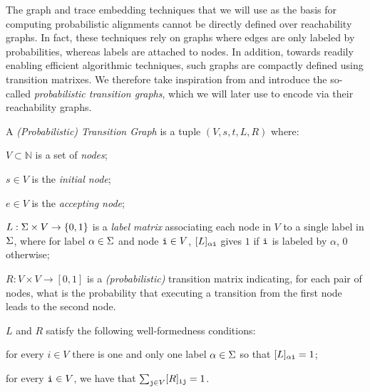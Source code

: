 The graph and trace embedding techniques that we will use as the basis for computing probabilistic alignments cannot be directly defined over reachability graphs. In fact, these techniques rely on graphs where edges are only labeled by probabilities, whereas labels are attached to nodes. In addition, towards readily enabling efficient algorithmic techniques, such graphs are compactly defined using transition matrixes. We therefore take inspiration from \cite{GartnerFW03} and introduce the so-called \emph{probabilistic transition graphs}, which we will later use to encode  via their reachability graphs.

\begin{definition} A \emph{(Probabilistic) Transition Graph} is a tuple $(V,s,t,L,R)$ where:
  \begin{inparaenum}[\itshape (i)]
    \item $V \subset \mathbb{N}$ is a set of \emph{nodes};
    \item $s\in V$ is the \emph{initial node};
    \item $e\in V$ is the \emph{accepting node};
    \item $L: \Sigma \times V \rightarrow \{0,1\}$ is a \emph{label matrix} associating each node in $V$ to a single label in $\Sigma$, where for label $\alpha \in \Sigma$ and node $\textnormal{\texttt{i}} \in V$, $[L]_{\alpha\textnormal{\texttt{i}}}$ gives $1$ if $\textnormal{\texttt{i}}$ is labeled by $\alpha$, $0$ otherwise;
    \item $R: V \times V \rightarrow [0,1]$ is a \emph{(probabilistic)} transition matrix indicating, for each pair of nodes, what is the probability that executing a transition from the first node leads to the second node.
  \end{inparaenum}
$L$ and $R$ satisfy the following well-formedness conditions:
\begin{inparaenum}[\itshape (i)]
\item for every $i \in V$ there is one and only one label $\alpha \in \Sigma$ so   that $[L]_{\alpha\textnormal{\texttt{i}}}=1$;
\item  for  every $\textnormal{\texttt{i}} \in V$, we have that $\sum_{\textnormal{\texttt{j}}\in V}[R]_{\textnormal{\texttt{ij}}}=1$.
\end{inparaenum}
\end{definition}
